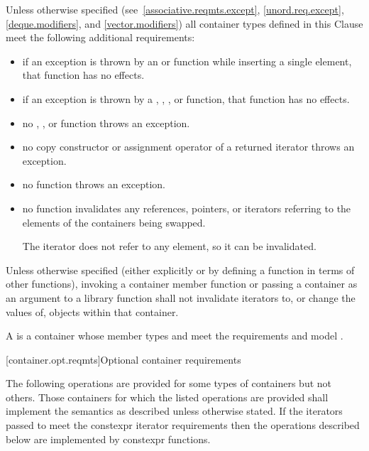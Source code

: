 \pnum
Unless otherwise specified (see~\ref{associative.reqmts.except}, \ref{unord.req.except}, \ref{deque.modifiers}, and
\ref{vector.modifiers})
all container types defined in this Clause meet
the following additional requirements:

\begin{itemize}
\item
if an exception is thrown by an
 or 
function while inserting a single element, that
function has no effects.
\item
if an exception is thrown by a
,
,
, or 
function, that function has no effects.
\item
no
,
,
or
function throws an exception.
\item
no copy constructor or assignment operator of a returned iterator
throws an exception.
\item
no
function throws an exception.
\item
no
function invalidates any references,
pointers, or iterators referring to the elements
of the containers being swapped.
\begin{note}
The  iterator does not refer to any element, so it can be invalidated.
\end{note}
\end{itemize}

\pnum
Unless otherwise specified (either explicitly or by defining a
function in terms of other functions), invoking a container member
function or passing a container as an argument to a library function
shall not invalidate iterators to, or change the values of, objects
within that container.

\pnum
A 
is a container
whose member types  and 
meet the
 requirements and
model .

[container.opt.reqmts]{Optional container requirements}

\pnum
The following operations are provided
for some types of containers but not others. Those containers for which the
listed operations are provided shall implement the semantics as described
unless otherwise stated.
If the iterators passed to 
meet the constexpr iterator requirements
then the operations described below
are implemented by constexpr functions.

